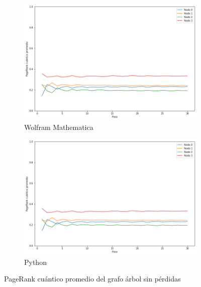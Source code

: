 \begin{figure}[H]
    \centering
    \begin{subfigure}[m]{0.45\textwidth}
        \centering
        \includegraphics[width=0.9\linewidth]{img/tree-mean-M.png}
        \caption{Wolfram Mathematica}
    \end{subfigure}
    \begin{subfigure}[m]{0.45\textwidth}
        \centering
        \includegraphics[width=0.9\linewidth]{img/tree-mean-lossless.png}
        \caption{Python}
    \end{subfigure}
    \caption[PageRank cuántico promedio del grafo árbol sin pérdidas]{PageRank cuántico promedio del grafo árbol sin pérdidas}
    \label{fig:meantreelossless}
\end{figure}


